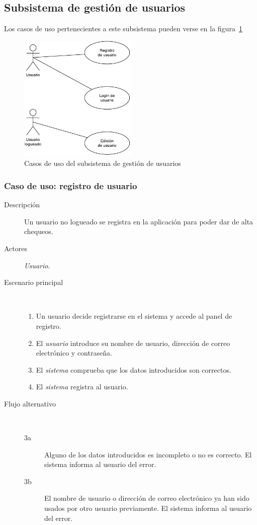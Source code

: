 \subsection{Subsistema de gestión de usuarios}

Los casos de uso pertenecientes a este subsistema pueden verse en la
figura~\ref{fig:subsistema-usuarios}

\begin{figure}[hp]
  \centering
  \includegraphics[width=0.5\textwidth]{4_analisis/diagrama_subsistema_gestion_usuarios}
  \caption{Casos de uso del subsistema de gestión de usuarios}
  \label{fig:subsistema-usuarios}
\end{figure}

\subsubsection{Caso de uso: registro de usuario}

\begin{description}
\item[Descripción] Un usuario no logueado se registra en la aplicación para poder dar de alta chequeos.
\item[Actores] \textit{Usuario}.
\item[Escenario principal] $\quad$
  \begin{enumerate}
  \item Un usuario decide registrarse en el sistema y accede al panel de registro.
  \item El \textit{usuario} introduce su nombre de usuario, dirección de correo electrónico y contraseña.
  \item El \textit{sistema} comprueba que los datos introducidos son correctos.
  \item El \textit{sistema} registra al usuario.
  \end{enumerate}
\item[Flujo alternativo] $\quad$
  \begin{description}
  \item[3a] Alguno de los datos introducidos es incompleto o no es correcto. El
    sistema informa al usuario del error.
  \item[3b] El nombre de usuario o dirección de correo electrónico ya han sido
    usados por otro usuario previamente. El sistema informa al usuario del error.
  \end{description}
\end{description}


